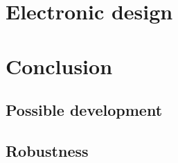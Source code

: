 \section{Electronic design}

%
%
%
\clearpage
\section{Conclusion}
\label{sec:conclusion}

%
\subsection{Possible development}

%
\subsection{Robustness}

%
\newpage
%


\setlength{\bibsep}{10pt}


%


%
